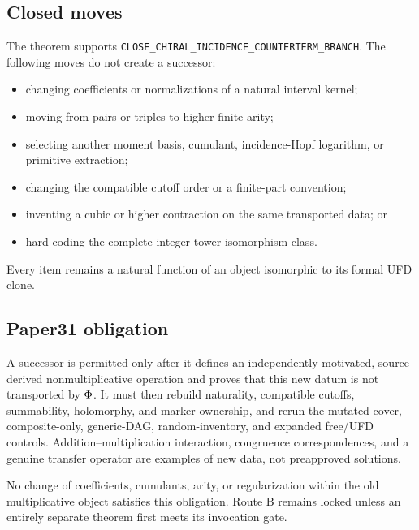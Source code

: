 \subsection{Closed moves}

The theorem supports
\texttt{CLOSE\_CHIRAL\_INCIDENCE\_COUNTERTERM\_BRANCH}.  The following
moves do not create a successor:
\begin{itemize}
\item changing coefficients or normalizations of a natural interval kernel;
\item moving from pairs or triples to higher finite arity;
\item selecting another moment basis, cumulant, incidence-Hopf logarithm, or
  primitive extraction;
\item changing the compatible cutoff order or a finite-part convention;
\item inventing a cubic or higher contraction on the same transported data;
  or
\item hard-coding the complete integer-tower isomorphism class.
\end{itemize}
Every item remains a natural function of an object isomorphic to its formal
UFD clone.

\subsection{Paper31 obligation}

A successor is permitted only after it defines an independently motivated,
source-derived nonmultiplicative operation and proves that this new datum is
not transported by \(\Phi\).  It must then rebuild naturality, compatible
cutoffs, summability, holomorphy, and marker ownership, and rerun the
mutated-cover, composite-only, generic-DAG, random-inventory, and expanded
free/UFD controls.  Addition--multiplication interaction, congruence
correspondences, and a genuine transfer operator are examples of new data,
not preapproved solutions.

No change of coefficients, cumulants, arity, or regularization within the
old multiplicative object satisfies this obligation.  Route B remains
locked unless an entirely separate theorem first meets its invocation gate.
